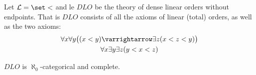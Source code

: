 \documentclass[10pt]{article}
\let\to=\varrightarrow
\def\mL{\mathcal{L}}
\begin{document}


\bigskip

\def\DLO{\mathit{DLO}}

Let $\mL=\set<$ and le $\DLO$ be the theory of dense linear orders without endpoints.
That is $\DLO$ consists of all the axioms of linear (total) orders, as well as the two axioms:
\begin{gather*}
    \forall x\forall y\bigl((x < y)\to\exists z(x<z<y)\bigr) \\
    \forall x\exists y\exists z(y<x<z)
\end{gather*}

\begin{prop*}

    $\DLO$ is $\aleph_0$-categorical and complete.

\end{prop*}
\end{document}
